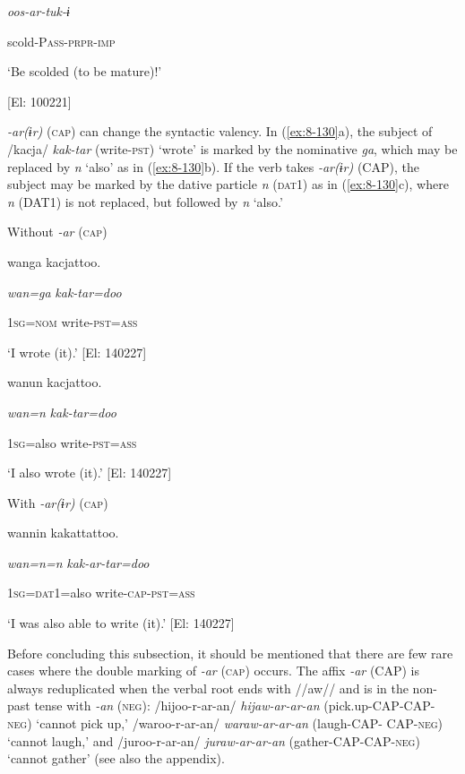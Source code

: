     \textit{oos-ar-tuk{}-ɨ}

    scold-P\textsc{ass}-\textsc{prpr}-\textsc{imp}

    ‘Be scolded (to be mature)!’

    [El: 100221]

  \textit{{}-ar(ɨr)} (\textsc{cap}) can change the syntactic valency. In (\ref{ex:8-130}a), the subject of /kacja/ \textit{kak-tar} (write-\textsc{pst}) ‘wrote’ is marked by the nominative \textit{ga}, which may be replaced by \textit{n} ‘also’ as in (\ref{ex:8-130}b). If the verb takes \textit{{}-ar(ɨr)} (CAP), the subject may be marked by the dative particle \textit{n} (\textsc{dat}1) as in (\ref{ex:8-130}c), where \textit{n} (DAT1) is not replaced, but followed by \textit{n} ‘also.’

\ea\label{ex:8-130}
  Without \textit{{}-ar} (\textsc{cap})

\ea {\TM}
\glll  wanga  kacjattoo.

      \textit{wan=ga}  \textit{kak-tar=doo}

      1\textsc{sg}=\textsc{nom}  write-\textsc{pst}=\textsc{ass}

\glt ‘I wrote (it).’ [El: 140227]

\ex {\TM}
\glll  wanun  kacjattoo.

      \textit{wan=n}  \textit{kak-tar=doo}

      1\textsc{sg}=also  write-\textsc{pst}=\textsc{ass}

\glt ‘I also wrote (it).’ [El: 140227]

  With \textit{{}-ar(ɨr)} (\textsc{cap})

\ex {\TM}
\glll  wannin  kakattattoo.

      \textit{wan=n=n}  \textit{kak-ar-tar=doo}

      1\textsc{sg}=\textsc{dat}1=also  write-\textsc{cap}-\textsc{pst}=\textsc{ass}

\glt ‘I was also able to write (it).’ [El: 140227]

  Before concluding this subsection, it should be mentioned that there are few rare cases where the double marking of \textit{{}-ar} (\textsc{cap}) occurs. The affix \textit{{}-ar} (CAP) is always reduplicated when the verbal root ends with //aw// and is in the non-past tense with \textit{-an} (\textsc{neg}): /hijoo-r-ar-an/ \textit{hijaw-ar-ar-an} (pick.up-CAP-CAP-\textsc{neg}) ‘cannot pick up,’ /waroo-r-ar-an/ \textit{waraw-ar-ar-an} (laugh-CAP- CAP-\textsc{neg}) ‘cannot laugh,’ and /juroo-r-ar-an/ \textit{juraw-ar-ar-an} (gather-CAP-CAP-\textsc{neg}) ‘cannot gather’ (see also the appendix).

